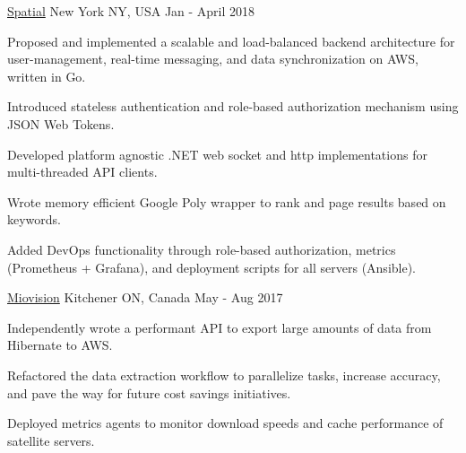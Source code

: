 \begin{cventries}
  {\href{https://spatial.is}{Spatial}} {New York NY, USA} {Jan - April 2018} {
    \begin{cvitems}
    \item Proposed and implemented a scalable and load-balanced backend
      architecture for user-management, real-time messaging, and data
      synchronization on AWS, written in Go.
    \item Introduced stateless authentication and role-based authorization
      mechanism using JSON Web Tokens.
    \item Developed platform agnostic .NET web socket and http implementations
      for multi-threaded API clients.
    \item Wrote memory efficient Google Poly wrapper to rank and page results
      based on keywords.
    \item Added DevOps functionality through role-based authorization, metrics
      (Prometheus + Grafana), and deployment scripts for all servers (Ansible).
    \end{cvitems}
  }
    
  {\href{https://miovision.com}{Miovision}} {Kitchener ON, Canada} {May - Aug
    2017} {
    \begin{cvitems}
    \item Independently wrote a performant API to export large amounts of data
      from Hibernate to AWS.
    \item Refactored the data extraction workflow to parallelize tasks, increase
      accuracy, and pave the way for future cost savings initiatives.
    \item Deployed metrics agents to monitor download speeds and cache
      performance of satellite servers.
    \end{cvitems}
  }

\end{cventries}
